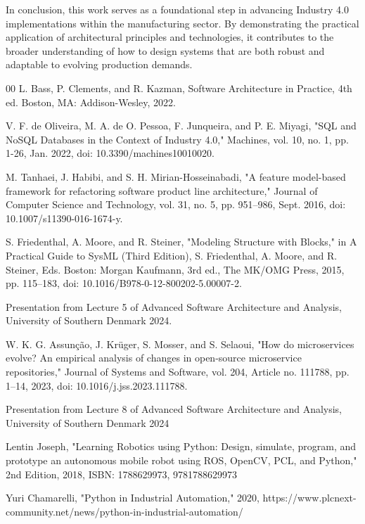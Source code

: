 \documentclass[conference]{IEEEtran}
\begin{document}
In conclusion, this work serves as a foundational step in advancing Industry 4.0 implementations within the manufacturing sector. By demonstrating the practical application of architectural principles and technologies, it contributes to the broader understanding of how to design systems that are both robust and adaptable to evolving production demands.

\begin{thebibliography}{00}
 L. Bass, P. Clements, and R. Kazman, Software Architecture in Practice, 4th ed. Boston, MA: Addison-Wesley, 2022.

 V. F. de Oliveira, M. A. de O. Pessoa, F. Junqueira, and P. E. Miyagi, "SQL and NoSQL Databases in the Context of Industry 4.0," Machines, vol. 10, no. 1, pp. 1-26, Jan. 2022, doi: 10.3390/machines10010020.

 M. Tanhaei, J. Habibi, and S. H. Mirian-Hosseinabadi, "A feature model-based framework for refactoring software product line architecture," Journal of Computer Science and Technology, vol. 31, no. 5, pp. 951–986, Sept. 2016, doi: 10.1007/s11390-016-1674-y.

S. Friedenthal, A. Moore, and R. Steiner, "Modeling Structure with Blocks," in A Practical Guide to SysML (Third Edition), S. Friedenthal, A. Moore, and R. Steiner, Eds. Boston: Morgan Kaufmann, 3rd ed., The MK/OMG Press, 2015, pp. 115–183, doi: 10.1016/B978-0-12-800202-5.00007-2.

Presentation from Lecture 5 of Advanced Software Architecture and Analysis, University of Southern Denmark 2024. 

W. K. G. Assunção, J. Krüger, S. Mosser, and S. Selaoui, "How do microservices evolve? An empirical analysis of changes in open-source microservice repositories," Journal of Systems and Software, vol. 204, Article no. 111788, pp. 1–14, 2023, doi: 10.1016/j.jss.2023.111788.

Presentation from Lecture 8 of Advanced Software Architecture and Analysis, University of Southern Denmark 2024

Lentin Joseph, "Learning Robotics using Python: Design, simulate, program, and prototype an autonomous mobile robot using ROS, OpenCV, PCL, and Python," 2nd Edition, 2018, ISBN: 1788629973, 9781788629973

 Yuri Chamarelli, "Python in Industrial Automation," 2020, https://www.plcnext-community.net/news/python-in-industrial-automation/


\end{thebibliography}
\end{document}
